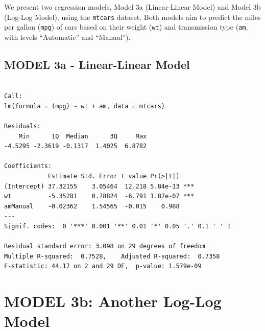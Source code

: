 \documentclass[
  letterpaper,
  DIV=11,
  numbers=noendperiod]{scrreport}
\newenvironment{Shaded}{\begin{snugshade}}{\end{snugshade}}
\newcommand{\AttributeTok}[1]{\textcolor[rgb]{0.40,0.45,0.13}{#1}}
\newcommand{\CommentTok}[1]{\textcolor[rgb]{0.37,0.37,0.37}{#1}}
\newcommand{\FunctionTok}[1]{\textcolor[rgb]{0.28,0.35,0.67}{#1}}
\newcommand{\NormalTok}[1]{\textcolor[rgb]{0.00,0.23,0.31}{#1}}
\newcommand{\OtherTok}[1]{\textcolor[rgb]{0.00,0.23,0.31}{#1}}
\newcommand{\SpecialCharTok}[1]{\textcolor[rgb]{0.37,0.37,0.37}{#1}}
\newcommand{\StringTok}[1]{\textcolor[rgb]{0.13,0.47,0.30}{#1}}
\begin{document}
We present two regression models, Model 3a (Linear-Linear Model) and
Model 3b (Log-Log Model), using the \texttt{mtcars} dataset. Both models
aim to predict the miles per gallon (\texttt{mpg}) of cars based on
their weight (\texttt{wt}) and transmission type (\texttt{am}, with
levels ``Automatic'' and ``Manual'').

\subsection{MODEL 3a - Linear-Linear
Model}\label{model-3a---linear-linear-model}

\begin{Shaded}
\end{Shaded}

\begin{verbatim}

Call:
lm(formula = (mpg) ~ wt + am, data = mtcars)

Residuals:
    Min      1Q  Median      3Q     Max 
-4.5295 -2.3619 -0.1317  1.4025  6.8782 

Coefficients:
            Estimate Std. Error t value Pr(>|t|)    
(Intercept) 37.32155    3.05464  12.218 5.84e-13 ***
wt          -5.35281    0.78824  -6.791 1.87e-07 ***
amManual    -0.02362    1.54565  -0.015    0.988    
---
Signif. codes:  0 '***' 0.001 '**' 0.01 '*' 0.05 '.' 0.1 ' ' 1

Residual standard error: 3.098 on 29 degrees of freedom
Multiple R-squared:  0.7528,    Adjusted R-squared:  0.7358 
F-statistic: 44.17 on 2 and 29 DF,  p-value: 1.579e-09
\end{verbatim}

\section{MODEL 3b: Another Log-Log
Model}\label{model-3b-another-log-log-model}
\end{document}
